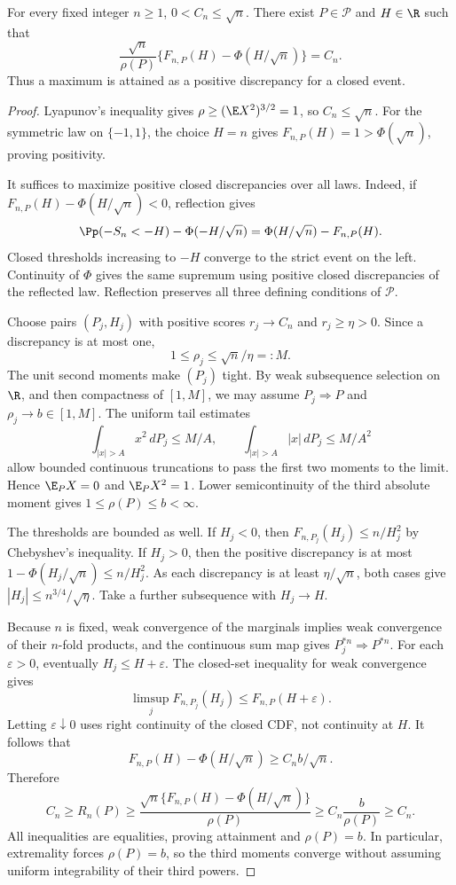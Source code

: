 \begin{lemma}
\label{ms:attainment}
For every fixed integer $n\ge1$, $0<C_n\le\sqrt n$. There exist
$P\in\mathcal P$ and $H\in\R$ such that
\[
 \frac{\sqrt n}{\rho(P)}
       \{F_{n,P}(H)-\Phi(H/\sqrt n)\}=C_n.
\]
Thus a maximum is attained as a positive discrepancy for a closed event.

\end{lemma}
\begin{proof}
Lyapunov's inequality gives $\rho\ge(\E X^2)^{3/2}=1$, so
$C_n\le\sqrt n$. For the symmetric law on $\{-1,1\}$, the choice $H=n$
gives $F_{n,P}(H)=1>\Phi(\sqrt n)$, proving positivity.

It suffices to maximize positive closed discrepancies over all laws. Indeed,
if $F_{n,P}(H)-\Phi(H/\sqrt n)<0$, reflection gives
\[
 \Pp(-S_n<-H)-\Phi(-H/\sqrt n)
       =\Phi(H/\sqrt n)-F_{n,P}(H).
\]
Closed thresholds increasing to $-H$ converge to the strict event on the
left. Continuity of $\Phi$ gives the same supremum using positive closed
discrepancies of the reflected law. Reflection preserves all three defining
conditions of $\mathcal P$.

Choose pairs $(P_j,H_j)$ with positive scores $r_j\to C_n$ and
$r_j\ge\eta>0$. Since a discrepancy is at most one,
\[
 1\le\rho_j\le\sqrt n/\eta=:M.
\]
The unit second moments make $(P_j)$ tight. By weak subsequence selection
on $\R$, and then compactness of $[1,M]$, we may assume
$P_j\Rightarrow P$ and $\rho_j\to b\in[1,M]$. The uniform tail estimates
\[
 \int_{|x|>A}x^2\,dP_j\le M/A,\qquad
 \int_{|x|>A}|x|\,dP_j\le M/A^2
\]
allow bounded continuous truncations to pass the first two moments to the
limit. Hence $\E_P X=0$ and $\E_P X^2=1$. Lower semicontinuity of the
third absolute moment gives $1\le\rho(P)\le b<\infty$.

The thresholds are bounded as well. If $H_j<0$, then
$F_{n,P_j}(H_j)\le n/H_j^2$ by Chebyshev's inequality. If $H_j>0$, then
the positive discrepancy is at most $1-\Phi(H_j/\sqrt n)\le n/H_j^2$.
As each discrepancy is at least $\eta/\sqrt n$, both cases give
$|H_j|\le n^{3/4}/\sqrt\eta$. Take a further subsequence with $H_j\to H$.

Because $n$ is fixed, weak convergence of the marginals implies weak
convergence of their $n$-fold products, and the continuous sum map gives
$P_j^{*n}\Rightarrow P^{*n}$. For each $\varepsilon>0$, eventually
$H_j\le H+\varepsilon$. The closed-set inequality for weak convergence gives
\[
 \limsup_j F_{n,P_j}(H_j)
 \le F_{n,P}(H+\varepsilon).
\]
Letting $\varepsilon\downarrow0$ uses right continuity of the closed CDF,
not continuity at $H$. It follows that
\[
 F_{n,P}(H)-\Phi(H/\sqrt n)\ge C_n b/\sqrt n.
\]
Therefore
\[
 C_n\ge R_n(P)\ge
 \frac{\sqrt n\{F_{n,P}(H)-\Phi(H/\sqrt n)\}}{\rho(P)}
 \ge C_n\frac b{\rho(P)}\ge C_n.
\]
All inequalities are equalities, proving attainment and $\rho(P)=b$.
In particular, extremality forces $\rho(P)=b$, so the third moments
converge without assuming uniform integrability of their third powers.
\end{proof}

